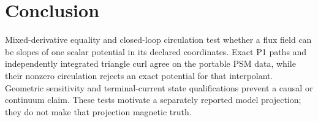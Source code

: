 \section{Conclusion}
Mixed-derivative equality and closed-loop circulation test whether a flux
field can be slopes of one scalar potential in its declared coordinates.
Exact P1 paths and independently integrated triangle curl agree on the portable
PSM data, while their nonzero circulation rejects an exact potential for that
interpolant. Geometric sensitivity and terminal-current state qualifications
prevent a causal or continuum claim. These tests motivate a separately
reported model projection; they do not make that projection magnetic truth.
